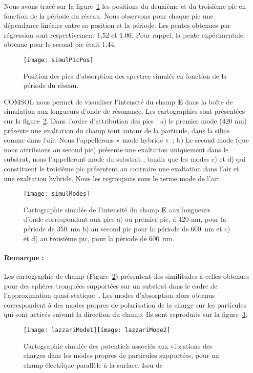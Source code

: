 Nous avons tracé sur la figure~\ref{simulPicPos} les positions du deuxième et du troisième pic en fonction de la période du réseau. Nous observons pour chaque pic une dépendance linéaire entre sa position et la période. Les pentes obtenues par régression sont respectivement 1,52 et 1,06. Pour rappel, la pente expérimentale obtenue pour le second pic était 1,44.\par 
\begin{figure}[!htb]
\centering
\texttt{[image: simulPicPos]}
\caption{Position des pics d'absorption des spectres simulés en fonction de la période du réseau.}
\label{simulPicPos}
\end{figure}

COMSOL nous permet de visualiser l'intensité du champ \textbf{E} dans la boîte de simulation aux longueurs d'onde de résonance. Les cartographies sont présentées sur la figure~\ref{simulModes}. Dans l'ordre d'attribution des pics : a) le premier mode (420 nm) présente une exaltation du champ tout autour de la particule, dans la silice comme dans l'air. Nous l'appellerons « mode hybride »~; b) Le second mode (que nous attribuons au second pic) présente une exaltation uniquement dans le substrat, nous l'appelleront \og mode du substrat \fg, tandis que les modes c) et d) qui constituent le troisième pic présentent au contraire une exaltation dans l'air et une exaltation hybride. Nous les regroupons sous le terme \og mode de l'air \fg.\par
\begin{figure}[!htb]
\centering
\texttt{[image: simulModes]}
\caption{Cartographie simulée de l'intensité du champ \textbf{E} aux longueurs d'onde correspondant aux pics a) au premier pic, à 420 nm, pour la période de 350~nm b) au second pic pour la période de 600~nm et c) et d) au troisième pic, pour la période de 600~nm.}
\label{simulModes}
\end{figure}

\paragraph*{Remarque :} Les cartographie de champ (Figure~\ref{simulModes}) présentent des similitudes à celles obtenues pour des sphères tronquées supportées sur un substrat dans le cadre de l'approximation quasi-statique~\cite{Lazzari02d, lazzari03, lazzari14b}. Les modes d'absorption alors obtenus correspondent à des modes propres de polarisation de la charge sur les particules qui sont activés suivant la direction du champ. Ils sont reproduits sur la figure~\ref{lazzariModes}.\par 
\begin{figure}[!htb]
\centering
\texttt{[image: lazzariMode1]}\texttt{[image: lazzariMode2]}
\caption{Cartographie simulée des potentiels associés aux vibrations des charges dans les modes propres de particules supportées, pour un champ électrique parallèle à la surface. Issu de~\cite{lazzari14b}}
\label{lazzariModes}
\end{figure}
